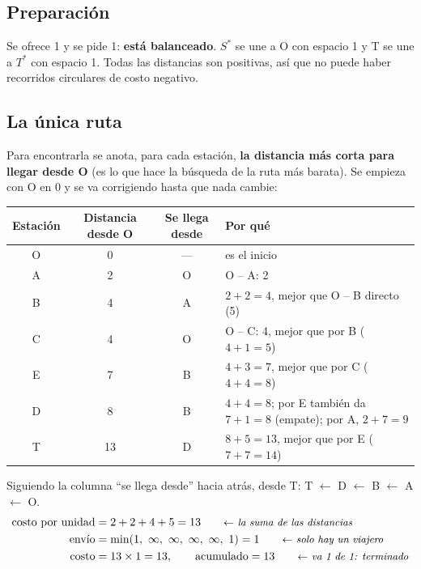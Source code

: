 \documentclass[11pt,a4paper]{article}
\newcommand{\Sini}{\ensuremath{S^{*}}}
\newcommand{\Tfin}{\ensuremath{T^{*}}}
\begin{document}
\subsection*{Preparación}
Se ofrece 1 y se pide 1: \textbf{está balanceado}. \Sini{} se une a O con espacio 1 y T se une a \Tfin{} con espacio 1.
Todas las distancias son positivas, así que no puede haber recorridos circulares de costo negativo.

\subsection*{La única ruta}

Para encontrarla se anota, para cada estación, \textbf{la distancia más corta para llegar desde O} (es lo que hace la
búsqueda de la ruta más barata). Se empieza con O en 0 y se va corrigiendo hasta que nada cambie:

\begin{center}\small
\begin{tabular}{cccp{6.4cm}}
\toprule
\textbf{Estación} & \textbf{Distancia desde O} & \textbf{Se llega desde} & \textbf{Por qué} \\
\midrule
O & 0  & --- & es el inicio \\
A & 2  & O & O -- A: 2 \\
B & 4  & A & $2 + 2 = 4$, mejor que O -- B directo (5) \\
C & 4  & O & O -- C: 4, mejor que por B ($4 + 1 = 5$) \\
E & 7  & B & $4 + 3 = 7$, mejor que por C ($4 + 4 = 8$) \\
D & 8  & B & $4 + 4 = 8$; por E también da $7 + 1 = 8$ (empate); por A, $2 + 7 = 9$ \\
T & 13 & D & $8 + 5 = 13$, mejor que por E ($7 + 7 = 14$) \\
\bottomrule
\end{tabular}
\end{center}

Siguiendo la columna ``se llega desde'' hacia atrás, desde T: T $\leftarrow$ D $\leftarrow$ B $\leftarrow$ A $\leftarrow$ O.
\begin{align*}
\text{costo por unidad} &= 2 + 2 + 4 + 5 = 13 \nota{la suma de las distancias}\\
\text{envío} &= \min(1,\ \infty,\ \infty,\ \infty,\ \infty,\ 1) = 1 \nota{solo hay un viajero}\\
\text{costo} &= 13 \times 1 = 13, \qquad \text{acumulado} = 13 \nota{va 1 de 1: terminado}
\end{align*}
\end{document}

